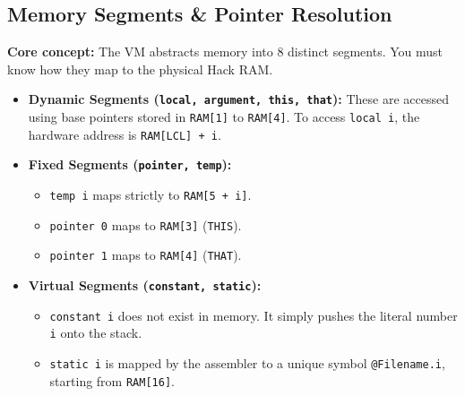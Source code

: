 \documentclass[12pt,a4paper]{article}
\begin{document}
\subsection{Memory Segments \& Pointer Resolution}
\textbf{Core concept:} The VM abstracts memory into 8 distinct segments. You must know how they map to the physical Hack RAM.
\begin{itemize}
    \item \textbf{Dynamic Segments (\texttt{local, argument, this, that}):} These are accessed using base pointers stored in \texttt{RAM[1]} to \texttt{RAM[4]}. To access \texttt{local i}, the hardware address is \texttt{RAM[LCL] + i}.
    \item \textbf{Fixed Segments (\texttt{pointer, temp}):} 
    \begin{itemize}
        \item \texttt{temp i} maps strictly to \texttt{RAM[5 + i]}.
        \item \texttt{pointer 0} maps to \texttt{RAM[3]} (\texttt{THIS}).
        \item \texttt{pointer 1} maps to \texttt{RAM[4]} (\texttt{THAT}).
    \end{itemize}
    \item \textbf{Virtual Segments (\texttt{constant, static}):}
    \begin{itemize}
        \item \texttt{constant i} does not exist in memory. It simply pushes the literal number \texttt{i} onto the stack.
        \item \texttt{static i} is mapped by the assembler to a unique symbol \texttt{@Filename.i}, starting from \texttt{RAM[16]}.
    \end{itemize}
\end{itemize}
\end{document}
